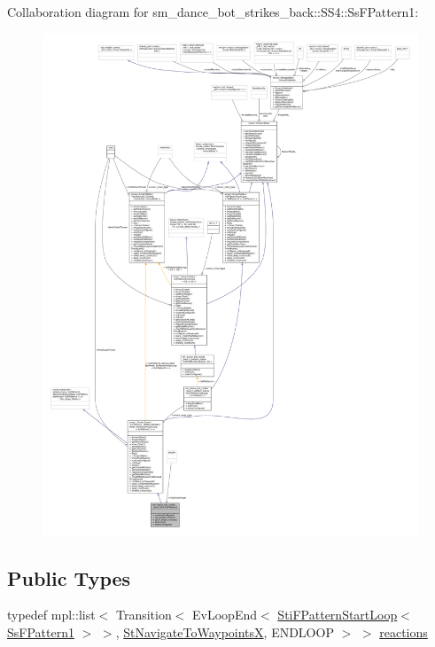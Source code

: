 Collaboration diagram for sm\+\_\+dance\+\_\+bot\+\_\+strikes\+\_\+back\+:\+:S\+S4\+:\+:Ss\+F\+Pattern1\+:
\nopagebreak
\begin{figure}[H]
\begin{center}
\leavevmode
\includegraphics[width=350pt]{structsm__dance__bot__strikes__back_1_1SS4_1_1SsFPattern1__coll__graph}
\end{center}
\end{figure}
\subsection*{Public Types}
\begin{DoxyCompactItemize}
\item 
typedef mpl\+::list$<$ Transition$<$ Ev\+Loop\+End$<$ \hyperlink{structsm__dance__bot__strikes__back_1_1f__pattern__states_1_1StiFPatternStartLoop}{Sti\+F\+Pattern\+Start\+Loop}$<$ \hyperlink{structsm__dance__bot__strikes__back_1_1SS4_1_1SsFPattern1}{Ss\+F\+Pattern1} $>$ $>$, \hyperlink{structsm__dance__bot__strikes__back_1_1StNavigateToWaypointsX}{St\+Navigate\+To\+WaypointsX}, E\+N\+D\+L\+O\+OP $>$ $>$ \hyperlink{structsm__dance__bot__strikes__back_1_1SS4_1_1SsFPattern1_acd918a85c4fdc759f80340faf7652b7d}{reactions}
\end{DoxyCompactItemize}
